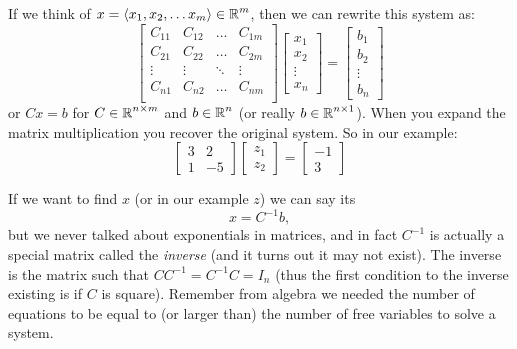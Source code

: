 If we think of $x = \langle x_1, x_2, \hdots x_m\rangle \in \operatorname{\mathbb{R}}^m$, then we can rewrite this system as: 
\[
\left[\begin{matrix}
C_{11} & C_{12} & \hdots & C_{1m}\\
C_{21} & C_{22} & \hdots & C_{2m}\\
\vdots & \vdots & \ddots & \vdots\\
C_{n1} & C_{n2} & \hdots & C_{nm}\\
\end{matrix}\right]
\left[\begin{matrix} x_1 \\ x_2 \\ \vdots \\ x_n \end{matrix}\right]
 = 
\left[\begin{matrix} b_1 \\ b_2 \\ \vdots \\ b_n \end{matrix}\right]
\]
or $Cx=b$ for $C\in\operatorname{\mathbb{R}}^{n\times m}$ and $b\in\operatorname{\mathbb{R}}^n$ (or really $b\in\operatorname{\mathbb{R}}^{n\times 1}$).
When you expand the matrix multiplication you recover the original system. 
So in our example: 
\[
\left[\begin{matrix} 3 & 2 \\ 1 & -5\end{matrix}\right]
\left[\begin{matrix} z_1 \\ z_2 \end{matrix}\right] = 
\left[\begin{matrix} -1 \\ 3\end{matrix}\right]
\]

If we want to find $x$ (or in our example $z$) 
we can say its \[x = C^{-1}b,\] 
but we never talked about exponentials in matrices, and in fact $C^{-1}$ is actually a special matrix 
called the \emph{inverse} (and it turns out it may not exist). 
The inverse is the matrix such that $CC^{-1} = C^{-1}C = I_n$ (thus the first condition to the inverse existing is if $C$ is square).
Remember from algebra we needed the number of equations to be equal to (or larger than) the number of free variables to solve a system. 

